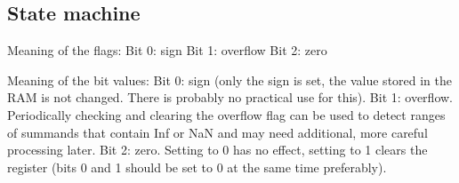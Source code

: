 \subsection{State machine}




    Meaning of the flags:
    Bit 0: sign
    Bit 1: overflow
    Bit 2: zero

    Meaning of the bit values:
    Bit 0: sign (only the sign is set, the value stored in the RAM is not
           changed. There is probably no practical use for this).
    Bit 1: overflow. Periodically checking and clearing the overflow flag
           can be used to detect ranges of summands that contain Inf or NaN
           and may need additional, more careful processing later.
    Bit 2: zero. Setting to 0 has no effect, setting to 1 clears the register
           (bits 0 and 1 should be set to 0 at the same time preferably).
